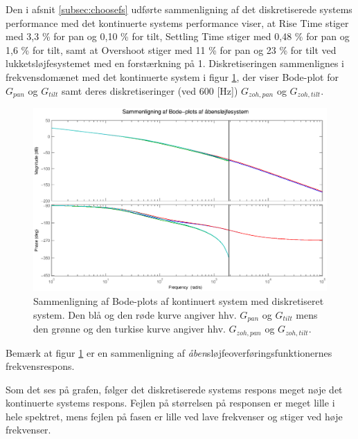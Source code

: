Den i afsnit \ref{subsec:choosefs} udførte sammenligning af det diskretiserede systems performance
med det kontinuerte systems performance viser,
at Rise Time stiger med 3,3 \% for pan og 0,10 \% for tilt,
Settling Time stiger med 0,48 \% for pan og 1,6 \% for tilt,
samt at Overshoot stiger med 11 \% for pan og 23 \% for tilt
ved lukketsløjfesystemet med en forstærkning på 1.
Diskretiseringen sammenlignes i frekvensdomænet med det kontinuerte system
i figur \ref{fig:diskretBode}, der viser Bode-plot for \(G_{pan}\) og \(G_{tilt}\) samt
deres diskretiseringer (ved 600 [Hz]) \(G_{zoh,pan}\) og \(G_{zoh,tilt}\).
\begin{figure}[!th]
\centering
	\includegraphics[width=1\textwidth]{./graphics/diskretBode.eps}
\caption[Sammenligning af Bode-plots af kontinuert system med diskretiseret system]
{Sammenligning af Bode-plots af kontinuert system med diskretiseret system.
Den blå og den røde kurve angiver hhv. \(G_{pan}\) og \(G_{tilt}\) mens
den grønne og den turkise kurve angiver hhv. \(G_{zoh,pan}\) og \(G_{zoh,tilt}\).
}
\label{fig:diskretBode}
\end{figure}
Bemærk at figur \ref{fig:diskretBode} er en sammenligning af \textit{åben}sløjfeoverføringsfunktionernes
frekvensrespons.

Som det ses på grafen, følger det diskretiserede systems respons meget nøje det kontinuerte systems respons.
Fejlen på størrelsen på responsen er meget lille i hele spektret,
mens fejlen på fasen er lille ved lave frekvenser og stiger ved høje frekvenser.

